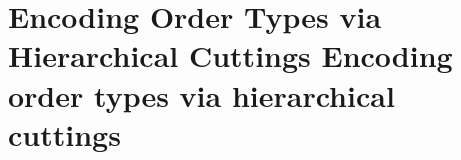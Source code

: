 \section{\iftitlecase%
Encoding Order Types via Hierarchical Cuttings\else%
Encoding order types via hierarchical cuttings\fi}\label{sec:lines-and-pseudolines}









\ifeurocg\else









\fi
